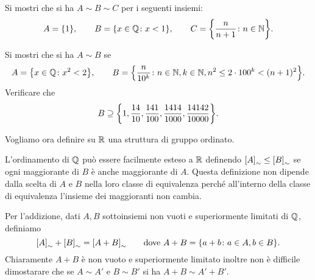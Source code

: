 \begin{exercise}
  Si mostri che si ha $A \sim B \sim C$
  per i seguenti insiemi:
  \[
  A = {\left\{ 1 \right\}}, \qquad 
  B = {\left\{ x\in {\mathbb Q}\colon x<1 \right\}}, \qquad
  C = {\left\{ \frac{n}{n+1}\colon n\in {\mathbb N} \right\}}.
  \]
\end{exercise}

\begin{exercise}
  Si mostri che si ha $A\sim B$ se
  \[
  A = {\left\{ x\in {\mathbb Q}\colon x^2<2 \right\}}, \qquad
  B = {\left\{ \frac{n}{10^k}\colon n\in {\mathbb N}, k\in {\mathbb N}, n^2 \le 2\cdot 100^k < (n+1)^2 \right\}}.  
  \]
  Verificare che 
  \[
    B \supseteq {\left\{ 
      1,\frac{14}{10},\frac{141}{100},\frac{1414}{1000},
      \frac{14142}{10000} \right\}}.
  \]
\end{exercise}

Vogliamo ora definire su ${\mathbb R}$ una struttura di gruppo ordinato.

L'ordinamento di ${\mathbb Q}$ può essere facilmente esteso a ${\mathbb R}$
definendo ${\left[ A \right]}_\sim \le {\left[ B \right]}_\sim$ se ogni maggiorante di $B$ 
è anche maggiorante di $A$. Questa definizione non dipende dalla scelta 
di $A$ e $B$ nella loro classe di equivalenza perché all'interno della classe di 
equivalenza l'insieme dei maggioranti 
non cambia.

Per l'addizione, dati $A,B$ sottoinsiemi non vuoti e superiormente limitati di ${\mathbb Q}$, 
definiamo 
\[
  {\left[ A \right]}_\sim+{\left[ B \right]}_\sim
  = {\left[ A+B \right]}_\sim
  \qquad\text{dove $A+B = {\left\{ a+b\colon a \in A, b \in B \right\}}$.}
\]
Chiaramente $A+B$ è non vuoto e superiormente limitato
inoltre non è difficile dimostarare che 
se $A\sim A'$ e $B\sim B'$ si ha $A+B\sim A'+B'$.


